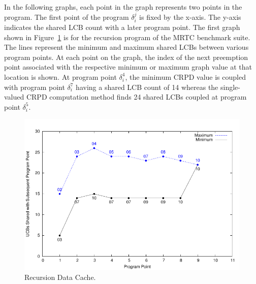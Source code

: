 In the following graphs, each point in the graph represents two points in the program. The first point of the program ${\delta_i^j}$ is fixed by the x-axis. The y-axis indicates the shared LCB count with a later program
point. The first graph shown in Figure~\ref{fig:recusion_data_cache} is for the recursion program of the MRTC benchmark suite.  The lines represent the minimum and maximum shared LCBs between various program points.
At each point on the graph, the index of the next preemption point associated with the respective minimum or maximum graph value at that location is shown.  At program point ${\delta_i^4}$, the minimum CRPD value is coupled with program point ${\delta_i^7}$ having a shared LCB count of 14 whereas the single-valued CRPD computation method finds 24 shared LCBs coupled at program point ${\delta_i^5}$.
%
\begin{figure}[h!]
\vspace{-10pt}
\begin{center}
\includegraphics[width=\linewidth]{eps/recursion-dcache.pdf}
\caption{Recursion Data Cache.}
\label{fig:recusion_data_cache}
\end{center}
\vspace{-10pt}
\end{figure}

